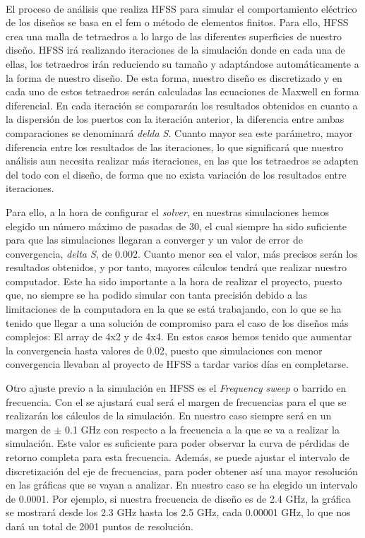 \\
\par El proceso de análisis que realiza HFSS para simular el comportamiento eléctrico de los diseños se basa en el \gls{fem} o método de elementos finitos. Para ello, HFSS crea una malla de tetraedros a lo largo de las diferentes superficies de nuestro diseño. HFSS irá realizando iteraciones de la simulación donde en cada una de ellas, los tetraedros irán reduciendo su tamaño y adaptándose automáticamente a la forma de nuestro diseño. De esta forma, nuestro diseño es discretizado y en cada uno de estos tetraedros serán calculadas las ecuaciones de Maxwell en forma diferencial. En cada iteración se compararán los resultados obtenidos en cuanto a la dispersión de los puertos con la iteración anterior, la diferencia entre ambas comparaciones se denominará \textit{delda S}. Cuanto mayor sea este parámetro, mayor diferencia entre los resultados de las iteraciones, lo que significará que nuestro análisis aun necesita realizar más iteraciones, en las que los tetraedros se adapten del todo con el diseño, de forma que no exista variación de los resultados entre iteraciones.
\\
\par Para ello, a la hora de configurar el \textit{solver}, en nuestras simulaciones hemos elegido un número máximo de pasadas de 30, el cual siempre ha sido suficiente para que las simulaciones llegaran a converger y un valor de error de convergencia, \textit{delta S}, de 0.002. Cuanto menor sea el valor, más precisos serán los resultados obtenidos, y por tanto, mayores cálculos tendrá que realizar nuestro computador. Este ha sido importante a la hora de realizar el proyecto, puesto que, no siempre se ha podido simular con tanta precisión debido a las limitaciones de la computadora en la que se está trabajando, con lo que se ha tenido que llegar a una solución de compromiso para el caso de los diseños más complejos: El array de 4x2 y de 4x4. En estos casos hemos tenido que aumentar la convergencia hasta valores de 0.02, puesto que simulaciones con menor convergencia llevaban al proyecto de HFSS a tardar varios días en completarse.
\\
\par Otro ajuste previo a la simulación en HFSS es el \textit{Frequency sweep} o barrido en frecuencia. Con el se ajustará cual será el margen de frecuencias para el que se realizarán los cálculos de la simulación. En nuestro caso siempre será en un margen de $\pm$ 0.1 GHz con respecto a la frecuencia a la que se va a realizar la simulación. Este valor es suficiente para poder observar la curva de pérdidas de retorno completa para esta frecuencia. Además, se puede ajustar el intervalo de discretización del eje de frecuencias, para poder obtener así una mayor resolución en las gráficas que se vayan a analizar. En nuestro caso se ha elegido un intervalo de 0.0001. Por ejemplo, si nuestra frecuencia de diseño es de 2.4 GHz, la gráfica se mostrará desde los 2.3 GHz hasta los 2.5 GHz, cada 0.00001 GHz, lo que nos dará un total de 2001 puntos de resolución.
